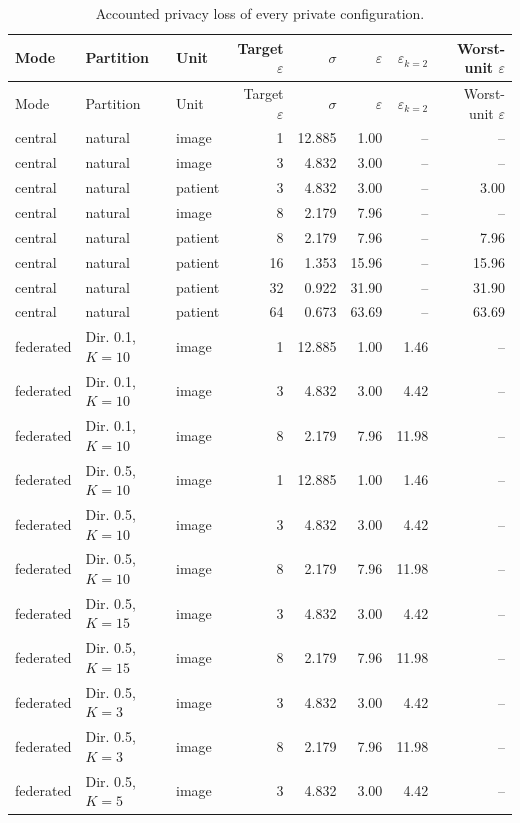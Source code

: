 {\scriptsize
\begin{longtable}{lllrrrrr}
\caption{Accounted privacy loss of every private configuration.}\label{tab:s_eps}\\
\toprule
Mode & Partition & Unit & Target $\varepsilon$ & $\sigma$ & $\varepsilon$ & $\varepsilon_{k=2}$ & Worst-unit $\varepsilon$ \\
\midrule
\endfirsthead
\toprule
Mode & Partition & Unit & Target $\varepsilon$ & $\sigma$ & $\varepsilon$ & $\varepsilon_{k=2}$ & Worst-unit $\varepsilon$ \\
\midrule
\endhead
\bottomrule
\endlastfoot
central & natural & image & 1 & 12.885 & 1.00 & -- & -- \\
central & natural & image & 3 & 4.832 & 3.00 & -- & -- \\
central & natural & patient & 3 & 4.832 & 3.00 & -- & 3.00 \\
central & natural & image & 8 & 2.179 & 7.96 & -- & -- \\
central & natural & patient & 8 & 2.179 & 7.96 & -- & 7.96 \\
central & natural & patient & 16 & 1.353 & 15.96 & -- & 15.96 \\
central & natural & patient & 32 & 0.922 & 31.90 & -- & 31.90 \\
central & natural & patient & 64 & 0.673 & 63.69 & -- & 63.69 \\
federated & Dir. 0.1, $K{=}10$ & image & 1 & 12.885 & 1.00 & 1.46 & -- \\
federated & Dir. 0.1, $K{=}10$ & image & 3 & 4.832 & 3.00 & 4.42 & -- \\
federated & Dir. 0.1, $K{=}10$ & image & 8 & 2.179 & 7.96 & 11.98 & -- \\
federated & Dir. 0.5, $K{=}10$ & image & 1 & 12.885 & 1.00 & 1.46 & -- \\
federated & Dir. 0.5, $K{=}10$ & image & 3 & 4.832 & 3.00 & 4.42 & -- \\
federated & Dir. 0.5, $K{=}10$ & image & 8 & 2.179 & 7.96 & 11.98 & -- \\
federated & Dir. 0.5, $K{=}15$ & image & 3 & 4.832 & 3.00 & 4.42 & -- \\
federated & Dir. 0.5, $K{=}15$ & image & 8 & 2.179 & 7.96 & 11.98 & -- \\
federated & Dir. 0.5, $K{=}3$ & image & 3 & 4.832 & 3.00 & 4.42 & -- \\
federated & Dir. 0.5, $K{=}3$ & image & 8 & 2.179 & 7.96 & 11.98 & -- \\
federated & Dir. 0.5, $K{=}5$ & image & 3 & 4.832 & 3.00 & 4.42 & -- \\

\end{longtable}}

